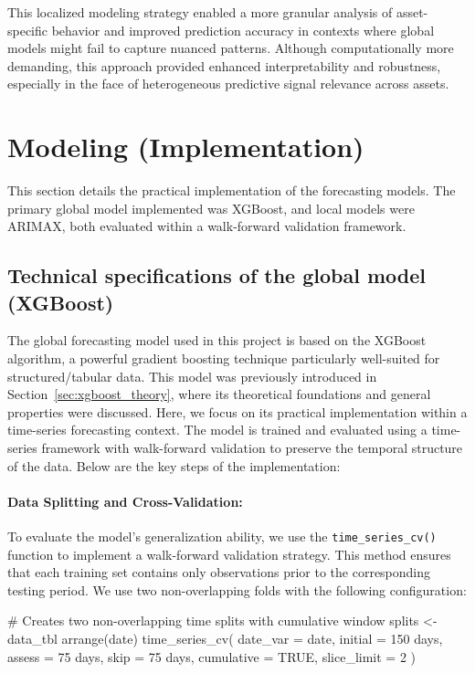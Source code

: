 \documentclass[12pt]{report}
\begin{document}
This localized modeling strategy enabled a more granular analysis of asset-specific behavior and improved prediction accuracy in contexts where global models might fail to capture nuanced patterns. Although computationally more demanding, this approach provided enhanced interpretability and robustness, especially in the face of heterogeneous predictive signal relevance across assets.

\newpage
\section{Modeling (Implementation)}
This section details the practical implementation of the forecasting models. The primary global model implemented was XGBoost, and local models were ARIMAX, both evaluated within a walk-forward validation framework.

\subsection{Technical specifications of the global model (XGBoost)}

The global forecasting model used in this project is based on the XGBoost algorithm, a powerful gradient boosting technique particularly well-suited for structured/tabular data. This model was previously introduced in Section~\ref{sec:xgboost_theory}, where its theoretical foundations and general properties were discussed. Here, we focus on its practical implementation within a time-series forecasting context. The model is trained and evaluated using a time-series framework with walk-forward validation to preserve the temporal structure of the data. Below are the key steps of the implementation:

\paragraph{Data Splitting and Cross-Validation:}
To evaluate the model's generalization ability, we use the \texttt{time\_series\_cv()} function to implement a walk-forward validation strategy. This method ensures that each training set contains only observations prior to the corresponding testing period. We use two non-overlapping folds with the following configuration:\\

\begin{code}[language=R]
# Creates two non-overlapping time splits with cumulative window
splits <- data_tbl %
  arrange(date) %
  time_series_cv(
    date_var   = date,        
    initial    = 150 days,  
    assess     = 75 days,   
    skip       = 75 days,   
    cumulative = TRUE,  
    slice_limit = 2   
  )
\end{code}\\
\end{document}
